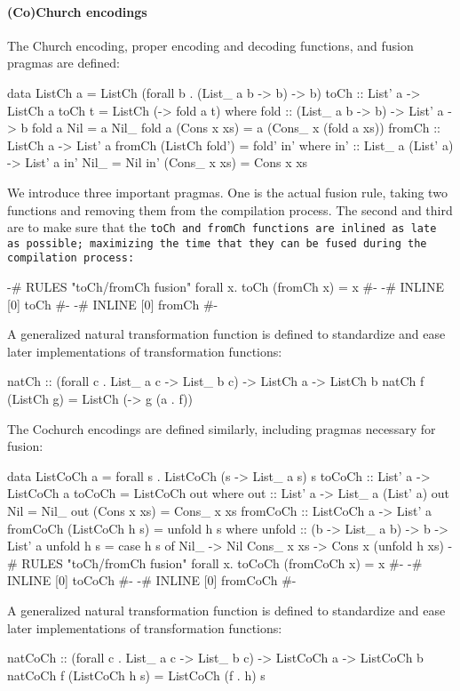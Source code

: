 \paragraph{(Co)Church encodings} The Church encoding, proper encoding and decoding functions, and fusion pragmas are defined:
\begin{code}
data ListCh a = ListCh (forall b . (List_ a b -> b) -> b)
toCh :: List' a -> ListCh a
toCh t = ListCh (\a -> fold a t)
  where fold :: (List_ a b -> b) -> List' a -> b
        fold a Nil         = a Nil_
        fold a (Cons x xs) = a (Cons_ x (fold a xs))
fromCh :: ListCh a -> List' a
fromCh (ListCh fold') = fold' in'
  where in' :: List_ a (List' a) -> List' a
        in' Nil_ = Nil
        in' (Cons_ x xs) = Cons x xs
\end{code}
We introduce three important pragmas.
One is the actual fusion rule, taking two functions and removing them from the compilation process.
The second and third are to make sure that the \tt{toCh} and \tt{fromCh} functions are inlined as late as possible; maximizing the time that they can be fused during the compilation process:
\begin{code}
{-# RULES "toCh/fromCh fusion" forall x. toCh (fromCh x) = x #-}
{-# INLINE [0] toCh #-}
{-# INLINE [0] fromCh #-}
\end{code}
A generalized natural transformation function is defined to standardize and ease later implementations of transformation functions:
\begin{code}
natCh :: (forall c . List_ a c -> List_ b c) -> ListCh a -> ListCh b
natCh f (ListCh g) = ListCh (\a -> g (a . f))
\end{code}
The Cochurch encodings are defined similarly, including pragmas necessary for fusion:
\begin{code}
data ListCoCh a = forall s . ListCoCh (s -> List_ a s) s
toCoCh :: List' a -> ListCoCh a
toCoCh = ListCoCh out
  where out :: List' a -> List_ a (List' a)
        out Nil = Nil_
        out (Cons x xs) = Cons_ x xs
fromCoCh :: ListCoCh a -> List' a
fromCoCh (ListCoCh h s) = unfold h s
  where unfold :: (b -> List_ a b) -> b -> List' a
        unfold h s = case h s of
          Nil_ -> Nil
          Cons_ x xs -> Cons x (unfold h xs)
{-# RULES "toCh/fromCh fusion" forall x. toCoCh (fromCoCh x) = x #-}
{-# INLINE [0] toCoCh #-}
{-# INLINE [0] fromCoCh #-}
\end{code}
A generalized natural transformation function is defined to standardize and ease later implementations of transformation functions:
\begin{code}
natCoCh :: (forall c . List_ a c -> List_ b c) -> ListCoCh a -> ListCoCh b
natCoCh f (ListCoCh h s) = ListCoCh (f . h) s
\end{code}
